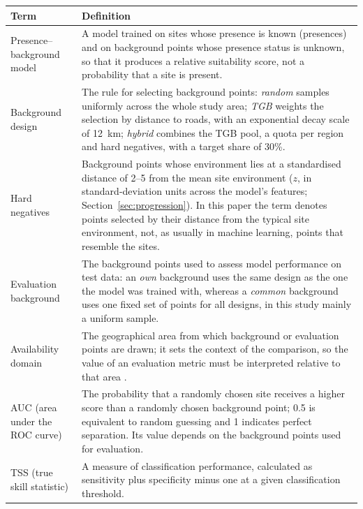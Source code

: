 \documentclass[12pt]{article}
\begin{document}
\begin{table}[htbp]
\centering
\small
\begin{tabular}{@{}>{\raggedright\arraybackslash}p{3.6cm}p{12.0cm}@{}}
\toprule
Term & Definition \\
\midrule
Presence--background model & A model trained on sites whose presence is known (presences) and on background points whose presence status is unknown, so that it produces a relative suitability score, not a probability that a site is present. \\
Background design & The rule for selecting background points: \emph{random} samples uniformly across the whole study area; \emph{TGB} weights the selection by distance to roads, with an exponential decay scale of 12~km; \emph{hybrid} combines the TGB pool, a quota per region and hard negatives, with a target share of 30\%. \\
Hard negatives & Background points whose environment lies at a standardised distance of 2--5 from the mean site environment ($z$, in standard-deviation units across the model's features; Section~\ref{sec:progression}). In this paper the term denotes points selected by their distance from the typical site environment, not, as usually in machine learning, points that resemble the sites. \\
Evaluation background & The background points used to assess model performance on test data: an \emph{own} background uses the same design as the one the model was trained with, whereas a \emph{common} background uses one fixed set of points for all designs, in this study mainly a uniform sample. \\
Availability domain & The geographical area from which background or evaluation points are drawn; it sets the context of the comparison, so the value of an evaluation metric must be interpreted relative to that area \citep{barve2011}. \\
AUC (area under the ROC curve) & The probability that a randomly chosen site receives a higher score than a randomly chosen background point; 0.5 is equivalent to random guessing and 1 indicates perfect separation. Its value depends on the background points used for evaluation. \\
TSS (true skill statistic) & A measure of classification performance, calculated as sensitivity plus specificity minus one at a given classification threshold. \\

\end{tabular}
\end{table}
\end{document}

